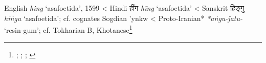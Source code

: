 \begin{etymology}\label{ety:hing}
English \textit{hing} `asafoetida', 1599
< Hindi {हींग} \textit{hīng} `asafoetida'
< Sanskrit {हिङ्गु} \textit{hiṅgu} `asafoetida'; cf. cognates Sogdian 'ynkw
< Proto-Iranian* \textit{*aṅgu-ǰatu-} `resin-gum'; cf. Tokharian B, Khotanese\footnote{\textcite[hing]{oed}; \textcite[hing]{oed}; \textcite[87]{gharib_sogdian_1995}; \textcite[7]{adams_dictionary_2013}}
\end{etymology}